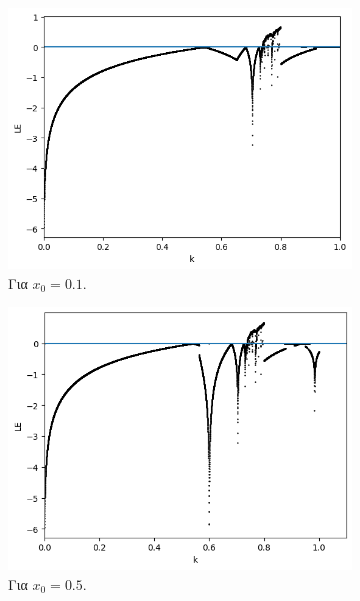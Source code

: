 \begin{figure}[h!]
	\centering

	\begin{subfigure}[b]{0.45\textwidth}
		\centering
		\includegraphics[width=\textwidth]{LateX images/graphs q14/g6}
		\caption{Για \(x_0=0.1\).}
		\label{f:g23}
	\end{subfigure}
	\hfill
	\begin{subfigure}[b]{0.45\textwidth}
		\centering
		\includegraphics[width=\textwidth]{LateX images/graphs q14/g7}
		\caption{Για \(x_0=0.5\).}
		\label{f:g24}
	\end{subfigure}
	\hfill
	\begin{subfigure}[b]{0.45\textwidth}

\end{subfigure}
\end{figure}
